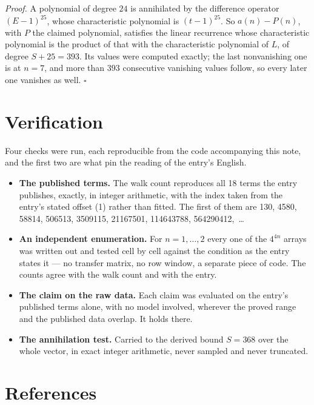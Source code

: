 \documentclass[11pt]{article}
\theoremstyle{definition}
\begin{document}
{\itshape Proof.} A polynomial of degree $24$ is annihilated by the difference operator $(E-1)^{25}$, whose characteristic polynomial is $(t-1)^{25}$. So $a(n) - P(n)$, with $P$ the claimed polynomial, satisfies the linear recurrence whose characteristic polynomial is the product of that with the characteristic polynomial of $L$, of degree $S + 25 = 393$. Its values were computed exactly; the last nonvanishing one is at $n = 7$, and more than $393$ consecutive vanishing values follow, so every later one vanishes as well. $\square$

\section{Verification}

Four checks were run, each reproducible from the code accompanying this note, and the first two are what pin the reading of the entry's English.

\begin{itemize}

\item {\bfseries The published terms.} The walk count reproduces all 18 terms the entry publishes, exactly, in integer arithmetic, with the index taken from the entry's stated offset (1) rather than fitted. The first of them are 130, 4580, 58814, 506513, 3509115, 21167501, 114643788, 564290412,~\dots

\item {\bfseries An independent enumeration.} For $n = 1,\dots,2$ every one of the $4^{4n}$ arrays was written out and tested cell by cell against the condition as the entry states it --- no transfer matrix, no row window, a separate piece of code. The counts agree with the walk count and with the entry.

\item {\bfseries The claim on the raw data.} Each claim was evaluated on the entry's published terms alone, with no model involved, wherever the proved range and the published data overlap. It holds there.

\item {\bfseries The annihilation test.} Carried to the derived bound $S = 368$ over the whole vector, in exact integer arithmetic, never sampled and never truncated.

\end{itemize}

\section{References}
\end{document}
